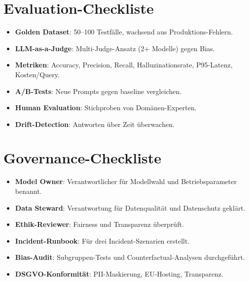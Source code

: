 \section{Evaluation-Checkliste}

\begin{itemize}[leftmargin=*]
     \item \textbf{Golden Dataset}\hspace{0pt}: 50--100 Testfälle, wachsend aus Produktions-Fehlern.
     \item \textbf{LLM-as-a-Judge}\hspace{0pt}: Multi-Judge-Ansatz (2+ Modelle) gegen Bias.
     \item \textbf{Metriken}\hspace{0pt}: Accuracy, Precision, Recall, Halluzinationsrate, P95-Latenz, Kosten/Query.
     \item \textbf{A/B-Tests}\hspace{0pt}: Neue Prompts gegen baseline vergleichen.
     \item \textbf{Human Evaluation}\hspace{0pt}: Stichproben von Domänen-Experten.
     \item \textbf{Drift-Detection}\hspace{0pt}: Antworten über Zeit überwachen.
\end{itemize}

\section{Governance-Checkliste}

\begin{itemize}[leftmargin=*]
     \item \textbf{Model Owner}\hspace{0pt}: Verantwortlicher für Modellwahl und Betriebsparameter benannt.
     \item \textbf{Data Steward}\hspace{0pt}: Verantwortung für Datenqualität und Datenschutz geklärt.
     \item \textbf{Ethik-Reviewer}\hspace{0pt}: Fairness und Transparenz überprüft.
     \item \textbf{Incident-Runbook}\hspace{0pt}: Für drei Incident-Szenarien erstellt.
     \item \textbf{Bias-Audit}\hspace{0pt}: Subgruppen-Tests und Counterfactual-Analysen durchgeführt.
     \item \textbf{DSGVO-Konformität}\hspace{0pt}: PII-Maskierung, EU-Hosting, Transparenz.
\end{itemize}

